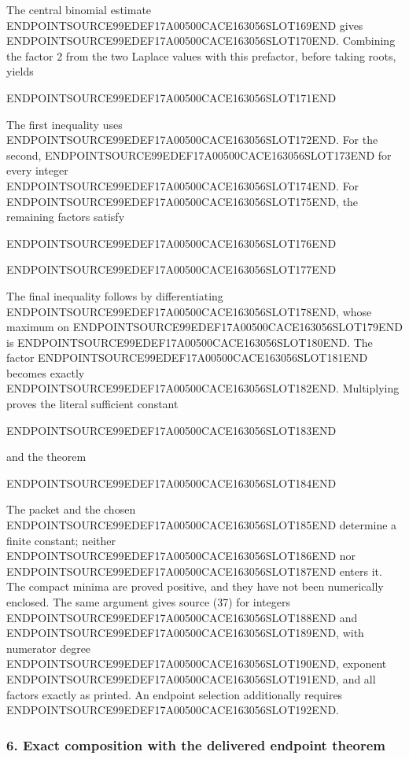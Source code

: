 The central binomial estimate ENDPOINTSOURCE99EDEF17A00500CACE163056SLOT169END gives ENDPOINTSOURCE99EDEF17A00500CACE163056SLOT170END. Combining the factor 2 from the two Laplace values with this prefactor, before taking roots, yields

ENDPOINTSOURCE99EDEF17A00500CACE163056SLOT171END

The first inequality uses ENDPOINTSOURCE99EDEF17A00500CACE163056SLOT172END. For the second, ENDPOINTSOURCE99EDEF17A00500CACE163056SLOT173END for every integer ENDPOINTSOURCE99EDEF17A00500CACE163056SLOT174END. For ENDPOINTSOURCE99EDEF17A00500CACE163056SLOT175END, the remaining factors satisfy

ENDPOINTSOURCE99EDEF17A00500CACE163056SLOT176END

ENDPOINTSOURCE99EDEF17A00500CACE163056SLOT177END

The final inequality follows by differentiating ENDPOINTSOURCE99EDEF17A00500CACE163056SLOT178END, whose maximum on ENDPOINTSOURCE99EDEF17A00500CACE163056SLOT179END is ENDPOINTSOURCE99EDEF17A00500CACE163056SLOT180END. The factor ENDPOINTSOURCE99EDEF17A00500CACE163056SLOT181END becomes exactly ENDPOINTSOURCE99EDEF17A00500CACE163056SLOT182END. Multiplying proves the literal sufficient constant

ENDPOINTSOURCE99EDEF17A00500CACE163056SLOT183END

and the theorem

ENDPOINTSOURCE99EDEF17A00500CACE163056SLOT184END

The packet and the chosen ENDPOINTSOURCE99EDEF17A00500CACE163056SLOT185END determine a finite constant; neither ENDPOINTSOURCE99EDEF17A00500CACE163056SLOT186END nor ENDPOINTSOURCE99EDEF17A00500CACE163056SLOT187END enters it. The compact minima are proved positive, and they have not been numerically enclosed. The same argument gives source (37) for integers ENDPOINTSOURCE99EDEF17A00500CACE163056SLOT188END and ENDPOINTSOURCE99EDEF17A00500CACE163056SLOT189END, with numerator degree ENDPOINTSOURCE99EDEF17A00500CACE163056SLOT190END, exponent ENDPOINTSOURCE99EDEF17A00500CACE163056SLOT191END, and all factors exactly as printed. An endpoint selection additionally requires ENDPOINTSOURCE99EDEF17A00500CACE163056SLOT192END.

\subsubsection{6. Exact composition with the delivered endpoint theorem}\label{endpoint-arithmetic_intake--exact-composition-with-the-delivered-endpoint-theorem}

